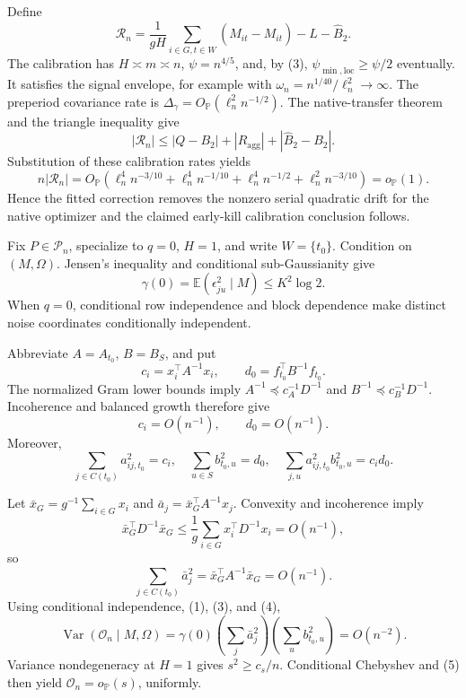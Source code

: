 Define
\[
 \mathcal R_n=\frac1{gH}\sum_{i\in G,t\in W}(\widehat M_{it}-M_{it})-L-\widehat B_2.
\]
The calibration has \(H\asymp m\asymp n\), \(\psi=n^{4/5}\), and, by (3), \(\psi_{\min,\mathrm{loc}}\ge\psi/2\) eventually.  It satisfies the signal envelope, for example with \(\omega_n=n^{1/40}/\ell_n^2\to\infty\).  The preperiod covariance rate is \(\Delta_\gamma=O_{\mathbb P}(\ell_n^2n^{-1/2})\).  The native-transfer theorem and the triangle inequality give
\[
 |\mathcal R_n|
 \le |Q-B_2|+|R_{\mathrm{agg}}|+|\widehat B_2-B_2|.
\]
Substitution of these calibration rates yields
\[
 n|\mathcal R_n|=O_{\mathbb P}\!\left(
 \ell_n^4n^{-3/10}+\ell_n^4n^{-1/10}
 +\ell_n^4n^{-1/2}+\ell_n^2n^{-3/10}\right)=o_{\mathbb P}(1).
 \tag{9}
\]
Hence the fitted correction removes the nonzero serial quadratic drift for the native optimizer and the claimed early-kill calibration conclusion follows.

Fix \(P\in\mathcal P_n\), specialize to \(q=0\), \(H=1\), and write \(W=\{t_0\}\).  Condition on \((M,\Omega)\).  Jensen's inequality and conditional sub-Gaussianity give
\[
 \gamma(0)=\mathbb E(\epsilon_{ju}^2\mid M)\le K^2\log2.
 \tag{1}
\]
When \(q=0\), conditional row independence and block dependence make distinct noise coordinates conditionally independent.

Abbreviate \(A=A_{t_0}\), \(B=B_S\), and put
\[
 c_i=x_i^{\top}A^{-1}x_i,
 \qquad d_0=f_{t_0}^{\top}B^{-1}f_{t_0}.
\]
The normalized Gram lower bounds imply \(A^{-1}\preceq c_A^{-1}D^{-1}\) and \(B^{-1}\preceq c_B^{-1}D^{-1}\).  Incoherence and balanced growth therefore give
\[
 c_i=O(n^{-1}),
 \qquad d_0=O(n^{-1}).
 \tag{2}
\]
Moreover,
\[
 \sum_{j\in C(t_0)}a_{ij,t_0}^2=c_i,
 \quad
 \sum_{u\in S}b_{t_0,u}^2=d_0,
 \quad
 \sum_{j,u}a_{ij,t_0}^2b_{t_0,u}^2=c_id_0.
 \tag{3}
\]

Let \(\bar x_G=g^{-1}\sum_{i\in G}x_i\) and \(\bar a_j=\bar x_G^{\top}A^{-1}x_j\).  Convexity and incoherence imply
\[
 \bar x_G^{\top}D^{-1}\bar x_G
 \le\frac1g\sum_{i\in G}x_i^{\top}D^{-1}x_i=O(n^{-1}),
\]
so
\[
 \sum_{j\in C(t_0)}\bar a_j^2
 =\bar x_G^{\top}A^{-1}\bar x_G=O(n^{-1}).
 \tag{4}
\]
Using conditional independence, (1), (3), and (4),
\[
 \operatorname{Var}(\mathcal O_n\mid M,\Omega)
 =\gamma(0)
 \left(\sum_j\bar a_j^2\right)
 \left(\sum_ub_{t_0,u}^2\right)=O(n^{-2}).
 \tag{5}
\]
Variance nondegeneracy at \(H=1\) gives \(s^2\ge c_s/n\).  Conditional Chebyshev and (5) then yield \(\mathcal O_n=o_{\mathbb P}(s)\), uniformly.


